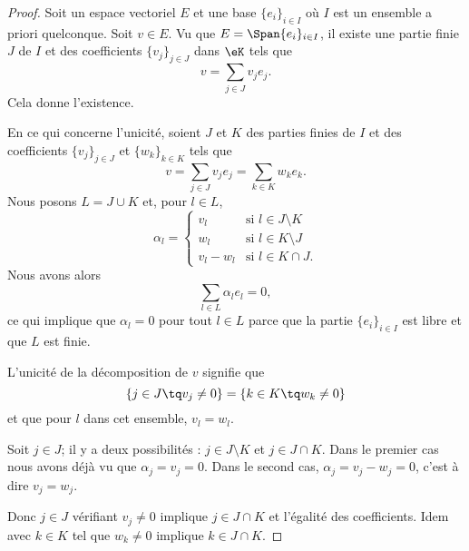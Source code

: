 \begin{proof}
    Soit un espace vectoriel \( E\) et une base \( \{ e_i \}_{i\in I}\) où \( I\) est un ensemble a priori quelconque. Soit \( v\in E\). Vu que \( E=\Span\{ e_i \}_{i\in I}\), il existe une partie finie \( J\) de \( I\) et des coefficients \( \{ v_j \}_{j\in J}\) dans \( \eK\) tels que
    \begin{equation}
        v=\sum_{j\in J}v_je_j.
    \end{equation}
    Cela donne l'existence.

    En ce qui concerne l'unicité, soient \( J \) et \( K\) des parties finies de \( I\) et des coefficients \( \{ v_j \}_{j\in J}\) et \( \{ w_{k} \}_{k\in K}\) tels que
    \begin{equation}
        v=\sum_{j\in J}v_je_j=\sum_{k\in K}w_{k}e_{k}.
    \end{equation}
    Nous posons \( L=J\cup K\) et, pour \( l\in L\),
    \begin{equation}
        \alpha_l=\begin{cases}
            v_l    &   \text{si } l\in J\setminus K\\
            w_l    &    \text{si } l\in K\setminus J\\
            v_l-w_l    &    \text{si } l\in K\cap J.
        \end{cases}
    \end{equation}
    Nous avons alors
    \begin{equation}
        \sum_{l\in L}\alpha_le_l=0,
    \end{equation}
    ce qui implique que \( \alpha_l=0\) pour tout \( l\in L\) parce que la partie \( \{ e_i \}_{i\in I}\) est libre et que \( L\) est finie.

    L'unicité de la décomposition de \( v\) signifie que
    \begin{equation}
        \{ j\in J \tq v_j\neq 0 \}=\{ k\in K\tq w_k\neq 0 \}
    \end{equation}
    et que pour \( l\) dans cet ensemble, \( v_l=w_l\).

    Soit \( j\in J\); il y a deux possibilités : \( j\in J\setminus K\) et \( j\in J\cap K\). Dans le premier cas nous avons déjà vu que \( \alpha_j=v_j=0\). Dans le second cas, \( \alpha_j=v_j-w_j=0\), c'est à dire \( v_j=w_j\).

    Donc \( j\in J\) vérifiant \( v_j\neq 0\) implique \( j\in J\cap K\) et l'égalité des coefficients. Idem avec \( k\in K\) tel que \( w_k\neq 0\) implique \( k\in J\cap K\).
\end{proof}

